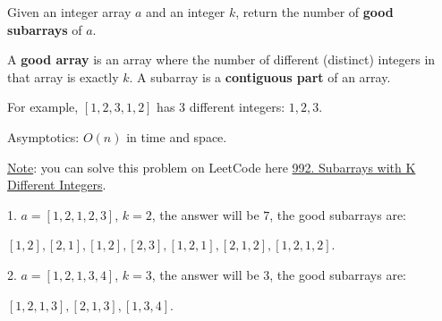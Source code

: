 
\begin{problem}

    Given an integer array $a$ and an integer $k$, return the number of \textbf{good subarrays} of $a$.

    A \textbf{good array} is an array where the number of different (distinct) integers in that array is exactly $k$. A subarray is a \textbf{contiguous part} of an array.

    For example, $[1, 2, 3, 1, 2]$ has $3$ different integers: $1, 2, 3$.

    Asymptotics: $O(n)$ in time and space. \newline


    \underline{Note}: you can solve this problem on LeetCode here \href{https://leetcode.com/problems/subarrays-with-k-different-integers/description/}{992. Subarrays with K Different Integers}.

\end{problem}

\begin{example}

    1. $a = [1,2,1,2,3]$, $k = 2$, the answer will be $7$, the good subarrays are:

    $[1,2], [2,1], [1,2], [2,3], [1,2,1], [2,1,2], [1,2,1,2]$.\newline

    2. $a = [1,2,1,3,4]$, $k = 3$, the answer will be $3$, the good subarrays are:

    $[1,2,1,3], [2,1,3], [1,3,4]$.

\end{example}







